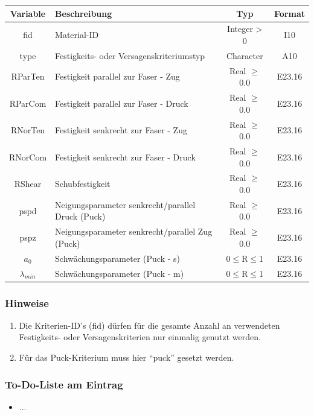 \documentclass[11pt,titlepage,listof=totoc,bibliography=totoc,twoside]{scrreprt}
\begin{document}
{{\begin{tabularx}{\textwidth}{cXcc}
\toprule
Variable& Beschreibung														& Typ			& Format\\
\midrule
fid	& Material-ID														& Integer > 0		& I10	\\
type	& Festigkeits- oder Versagenskriteriumstyp										& Character		& A10	\\
RParTen	& Festigkeit parallel zur Faser - Zug											& Real $\ge$ 0.0	& E23.16\\
RParCom	& Festigkeit parallel zur Faser - Druck											& Real $\ge$ 0.0	& E23.16\\
RNorTen	& Festigkeit senkrecht zur Faser - Zug											& Real $\ge$ 0.0	& E23.16\\
RNorCom	& Festigkeit senkrecht zur Faser - Druck										& Real $\ge$ 0.0	& E23.16\\
RShear	& Schubfestigkeit 													& Real $\ge$ 0.0	& E23.16\\
pspd	& Neigungsparameter senkrecht/parallel Druck (Puck)									& Real $\ge$ 0.0	& E23.16\\
pspz	& Neigungsparameter senkrecht/parallel Zug (Puck)									& Real $\ge$ 0.0	& E23.16\\
$a_0$	& Schwächungsparameter (Puck - s)											& 0$\le$R$\le$1		& E23.16\\
$\lambda_{min}$	& Schwächungsparameter (Puck - m)										& 0$\le$R$\le$1		& E23.16\\
\bottomrule
\end{tabularx}

\subsubsection{Hinweise}

\begin{enumerate}
\item Die Kriterien-ID's (fid) dürfen für die gesamte Anzahl an verwendeten Festigkeits- oder Versagenskriterien nur einmalig genutzt werden.
\item Für das Puck-Kriterium muss hier ``puck'' gesetzt werden.
\end{enumerate}

\subsubsection{To-Do-Liste am Eintrag}

\begin{itemize}
\item ...
\end{itemize}

}}
\end{document}
